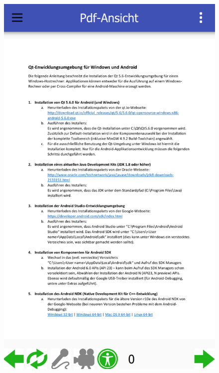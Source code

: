 \begin{figure}[ht!]
\begin{minipage}{0.31\linewidth}
		\includegraphics[scale=0.5]{GUI/Bilder/4-S-PDF-Ansicht.PNG}
	\end{minipage}
	\begin{minipage}{0.31\linewidth}
		\centering

\end{minipage}
\end{figure}
